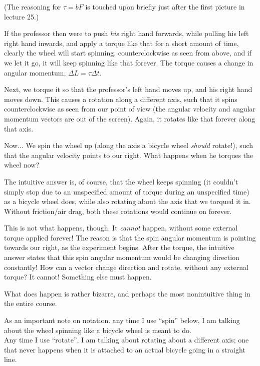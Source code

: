 \documentclass[8.01x]{subfiles}
\begin{document}
(The reasoning for $\tau = b F$ is touched upon briefly just after the first picture in lecture 25.)

If the professor then were to push \emph{his} right hand forwards, while pulling his left right hand inwards, and apply a torque like that for a short amount of time, clearly the wheel will start spinning, counterclockwise as seen from above, and if we let it go, it will keep spinning like that forever. The torque causes a change in angular momentum, $\Delta L = \tau \Delta t$.

Next, we torque it so that the professor's left hand moves up, and his right hand moves down. This causes a rotation along a different axis, such that it spins counterclockwise as seen from our point of view (the angular velocity and angular momentum vectors are out of the screen). Again, it rotates like that forever along that axis.

Now... We spin the wheel up (along the axis a bicycle wheel \emph{should} rotate!), such that the angular velocity points to our right. What happens when he torques the wheel now?

The intuitive answer is, of course, that the wheel keeps spinning (it couldn't simply stop due to an unspecified amount of torque during an unspecified time) as a bicycle wheel does, while also rotating about the axis that we torqued it in. Without friction/air drag, both these rotations would continue on forever.

This is not what happens, though. It \emph{cannot} happen, without some external torque applied forever! The reason is that the spin angular momentum is pointing towards our right, as the experiment begins. After the torque, the intuitive answer states that this spin angular momentum would be changing direction constantly! How can a vector change direction and rotate, without any external torque? It cannot! Something else must happen.

What does happen is rather bizarre, and perhaps the most nonintuitive thing in the entire course.

As an important note on notation. any time I use ``spin'' below, I am talking about the wheel spinning like a bicycle wheel is meant to do.\\
Any time I use ``rotate'', I am talking about rotating about a different axis; one that never happens when it is attached to an actual bicycle going in a straight line.
\end{document}
